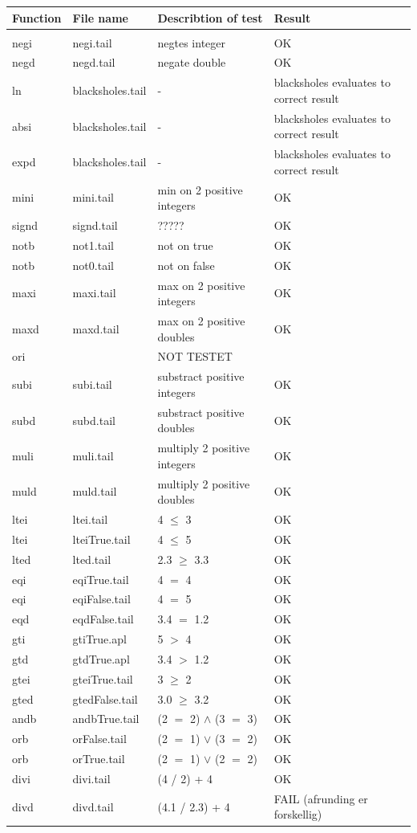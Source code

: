 \documentclass[11pt]{article}
\begin{document}
\begin{center}
\begin{tabular}{l l l l}
Function  		& File name		& Describtion of test			& Result \\ \hline \\
negi			& negi.tail			& negtes integer				& OK \\
negd 		& negd.tail			& negate double				& OK \\
ln 			& blacksholes.tail	& -					& blacksholes evaluates to correct result \\
absi 			& blacksholes.tail	& -					& blacksholes evaluates to correct result \\
expd 		& blacksholes.tail	& -					& blacksholes evaluates to correct result \\
mini 			& mini.tail			& min on 2 positive integers		& OK \\
signd 		& signd.tail			& ?????					& OK \\
notb			& not1.tail			& not on true				& OK \\
notb			& not0.tail			& not on false				& OK \\
maxi			& maxi.tail			& max on 2 positive integers	& OK \\
maxd		& maxd.tail		& max on 2 positive doubles	& OK \\
ori			& 				& NOT TESTET				&  \\
subi			& subi.tail			& substract positive integers	& OK \\
subd			& subd.tail			& substract positive doubles	& OK \\
muli			& muli.tail			& multiply 2 positive integers	& OK \\
muld			& muld.tail			& multiply 2 positive doubles	& OK \\
ltei			& ltei.tail			& 4 $\leq$ 3				& OK \\
ltei			& lteiTrue.tail		& 4 $\leq$ 5				& OK \\
lted			& lted.tail			& 2.3 $\geq$ 3.3				& OK \\
eqi			& eqiTrue.tail		& 4 $=$ 4					& OK \\
eqi 			& eqiFalse.tail		& 4 $=$ 5					& OK \\
eqd			& eqdFalse.tail		& 3.4 $=$ 1.2				& OK \\
gti			& gtiTrue.apl		& 5 $>$ 4					& OK \\
gtd			& gtdTrue.apl		& 3.4 $>$ 1.2				& OK \\
gtei			& gteiTrue.tail		& 3 $\geq$ 2				& OK \\
gted			& gtedFalse.tail		& 3.0 $\geq$ 3.2				& OK \\
andb 		& andbTrue.tail 		& (2 $=$ 2) $\land$ (3 $=$ 3)	& OK \\
orb			& orFalse.tail		& (2 $=$ 1) $\lor$ (3 $=$ 2)		& OK \\
orb			& orTrue.tail		& (2 $=$ 1) $\lor$ (2 $=$ 2)		& OK \\
divi 			& divi.tail			& (4 / 2) + 4				& OK \\
divd			& divd.tail			& (4.1 / 2.3) + 4				& FAIL (afrunding er forskellig)\\

\end{tabular}
\end{center}
\end{document}
